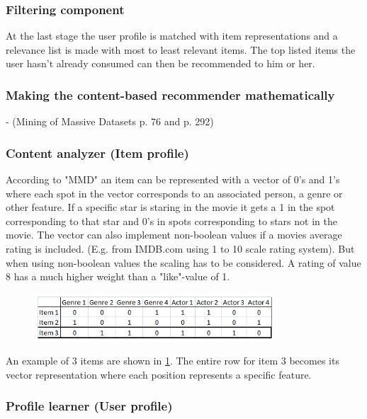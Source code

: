 \subsubsection{Filtering component}
At the last stage the user profile is matched with item representations and a relevance list is made with most to least relevant items. The top listed items the user hasn't already consumed can then be recommended to him or her.
 
\subsubsection{Making the content-based recommender mathematically}
- (Mining of Massive Datasets p. 76 and p. 292)

\subsubsection{Content analyzer (Item profile)}

According to "MMD" an item can be represented with a vector of 0's and 1's where each spot in the vector corresponds to an associated person, a genre or other feature. If a specific star is staring in the movie it gets a 1 in the spot corresponding to that star and 0's in spots corresponding to stars not in the movie. The vector can also implement non-boolean values if a movies average rating is included. (E.g. from IMDB.com using 1 to 10 scale rating system). But when using non-boolean values the scaling has to be considered. A rating of value 8 has a much higher weight than a "like"-value of 1.

\begin{figure}[H]
\centering
\includegraphics[width=0.8\textwidth]{Images/Vectorrepresentationitems.png}
\caption{}
\label{VrepItem}
\end{figure}

An example of 3 items are shown in \ref{VrepItem}. The entire row for item 3 becomes its vector representation where each position represents a specific feature.  
 
\subsubsection{Profile learner (User profile)}

